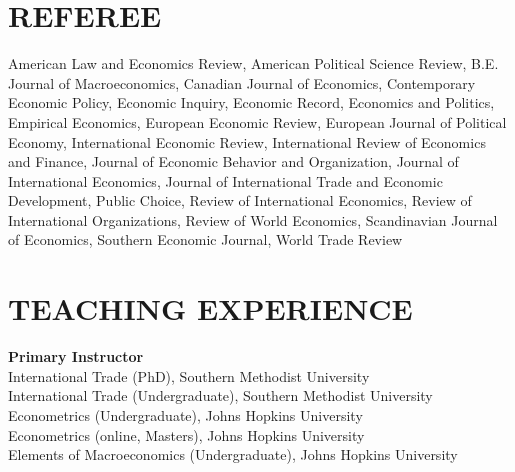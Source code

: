 \documentclass[11pt]{res}
\begin{document}
\begin{resume}

\section{REFEREE} \vspace{1.5mm}
American Law and Economics Review, American Political Science Review, B.E. Journal of Macroeconomics, Canadian Journal of Economics, Contemporary Economic Policy, Economic Inquiry, 
Economic Record, Economics and Politics, Empirical Economics, European Economic Review, European Journal of Political Economy, International Economic Review, International Review of Economics and Finance, Journal of Economic Behavior and Organization, Journal of International Economics, Journal of International Trade and Economic Development, Public Choice, Review of International Economics, Review of International Organizations, Review of World Economics, Scandinavian Journal of Economics, Southern Economic Journal, World Trade Review

\section{TEACHING EXPERIENCE} \vspace{1.5mm}
{\bf Primary Instructor}\vspace{1.5mm}\\
International Trade (PhD), Southern Methodist University\vspace{1.5mm}\\
International Trade (Undergraduate), Southern Methodist University\vspace{1.5mm}\\
Econometrics (Undergraduate), Johns Hopkins University\vspace{1.5mm}\\
Econometrics (online, Masters), Johns Hopkins University\vspace{1.5mm}\\
Elements of Macroeconomics (Undergraduate), Johns Hopkins University



\end{resume}
\end{document}
